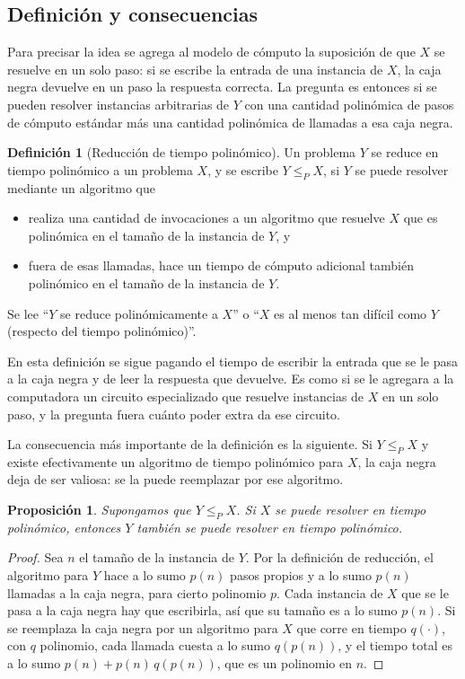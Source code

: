 \documentclass[12pt, spanish, oneside, openany]{book}
\newcommand{\redp}{\le_{P}}
\theoremstyle{uprightplain}
\newtheorem{proposicion}[teorema]{Proposición}
\theoremstyle{definition}
\newtheorem{definicion}[teorema]{Definición}
\theoremstyle{remark}
\theoremstyle{definition}
\begin{document}
\subsection{Definición y consecuencias}

Para precisar la idea se agrega al modelo de cómputo la suposición de que $X$ se resuelve en un solo paso: si se escribe la entrada de una instancia de $X$, la caja negra devuelve en un paso la respuesta correcta. La pregunta es entonces si se pueden resolver instancias arbitrarias de $Y$ con una cantidad polinómica de pasos de cómputo estándar más una cantidad polinómica de llamadas a esa caja negra.

\begin{definicion}[Reducción de tiempo polinómico]
\label{def:np-reduccion}
Un problema $Y$ se reduce en tiempo polinómico a un problema $X$, y se escribe $Y\redp X$, si $Y$ se puede resolver mediante un algoritmo que
\begin{itemize}
    \item realiza una cantidad de invocaciones a un algoritmo que resuelve $X$ que es polinómica en el tamaño de la instancia de $Y$, y
    \item fuera de esas llamadas, hace un tiempo de cómputo adicional también polinómico en el tamaño de la instancia de $Y$.
\end{itemize}
Se lee ``$Y$ se reduce polinómicamente a $X$'' o ``$X$ es al menos tan difícil como $Y$ (respecto del tiempo polinómico)''.
\end{definicion}

En esta definición se sigue pagando el tiempo de escribir la entrada que se le pasa a la caja negra y de leer la respuesta que devuelve. Es como si se le agregara a la computadora un circuito especializado que resuelve instancias de $X$ en un solo paso, y la pregunta fuera cuánto poder extra da ese circuito.

La consecuencia más importante de la definición es la siguiente. Si $Y\redp X$ y existe efectivamente un algoritmo de tiempo polinómico para $X$, la caja negra deja de ser valiosa: se la puede reemplazar por ese algoritmo.

\begin{proposicion}
\label{prop:np-red-poly}
Supongamos que $Y\redp X$. Si $X$ se puede resolver en tiempo polinómico, entonces $Y$ también se puede resolver en tiempo polinómico.
\end{proposicion}
\begin{proof}
Sea $n$ el tamaño de la instancia de $Y$. Por la definición de reducción, el algoritmo para $Y$ hace a lo sumo $p(n)$ pasos propios y a lo sumo $p(n)$ llamadas a la caja negra, para cierto polinomio $p$. Cada instancia de $X$ que se le pasa a la caja negra hay que escribirla, así que su tamaño es a lo sumo $p(n)$. Si se reemplaza la caja negra por un algoritmo para $X$ que corre en tiempo $q(\cdot)$, con $q$ polinomio, cada llamada cuesta a lo sumo $q(p(n))$, y el tiempo total es a lo sumo $p(n)+p(n)\,q(p(n))$, que es un polinomio en $n$.
\end{proof}
\end{document}
